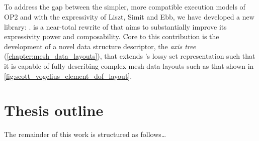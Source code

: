 \documentclass[thesis]{subfiles}
\begin{document}

\subsection{}


To address the gap between the simpler, more compatible execution models of OP2 and  with the expressivity of Liszt, Simit and Ebb, we have developed a new library: .
 is a near-total rewrite of  that aims to substantially improve its expressivity power and composability.
Core to this contribution is the development of a novel data structure descriptor, the \textit{axis tree} (\cref{chapter:mesh_data_layouts}), that extends 's lossy set representation such that it is capable of fully describing complex mesh data layouts such as that shown in \cref{fig:scott_vogelius_element_dof_layout}.



\section{Thesis outline}

The remainder of this work is structured as follows\dots
\end{document}
